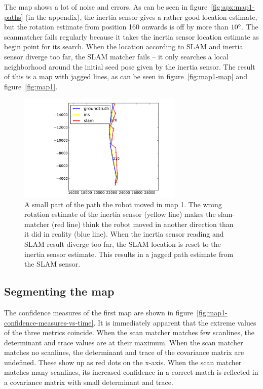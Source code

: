 The map shows a lot of noise and errors. As can be seen in figure~\ref{fig:apx:map1-paths} (in the appendix), the inertia sensor gives a rather good location-estimate, but the rotation estimate from position 160 onwards is off by more than $10\degree$. The scanmatcher fails regularly because it takes the inertia sensor location estimate as begin point for its search. When the location according to SLAM and inertia sensor diverge too far, the SLAM matcher fails -- it only searches a local neighborhood around the initial seed pose given by the inertia sensor. The result of this is a map with jagged lines, as can be seen in figure~\ref{fig:map1-map} and figure~\ref{fig:map1}.

\begin{figure}[ht]
  \centering
  \includegraphics[width=0.7\textwidth]{images/experiment/map1/ins-problem.pdf}
  \caption{A small part of the path the robot moved in map 1. The wrong rotation estimate of the inertia sensor (yellow line) makes the slam-matcher (red line) think the robot moved in another direction than it did in reality (blue line). When the inertia sensor reading and SLAM result diverge too far, the SLAM location is reset to the inertia sensor estimate. This results in a jagged path estimate from the SLAM sensor.}
  \label{fig:map1-ins-problem}
\end{figure}


\subsection{Segmenting the map}
The confidence measures of the first map are shown in figure~\ref{fig:map1-confidence-measures-vs-time}. It is immediately apparent that the extreme values of the three metrics coincide. When the scan matcher matches few scanlines, the determinant and trace values are at their maximum. When the scan matcher matches no scanlines, the determinant and trace of the covariance matrix are undefined. These show up as red dots on the x-axis. When the scan matcher matches many scanlines, its increased confidence in a correct match is reflected in a covariance matrix with small determinant and trace.

